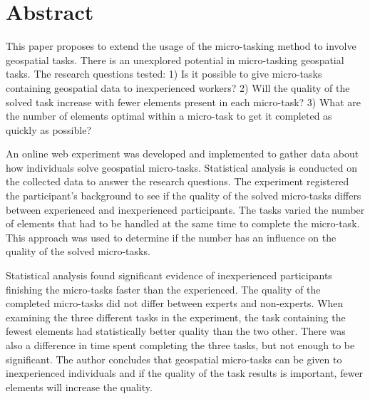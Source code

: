\chapter*{Abstract}
%

This paper proposes to extend the usage of the micro-tasking method to involve geospatial tasks. There is an unexplored potential in micro-tasking geospatial tasks. The research questions tested: 1) Is it possible to give micro-tasks containing geospatial data to inexperienced workers? 2) Will the quality of the solved task increase with fewer elements present in each micro-task? 3) What are the number of elements optimal within a micro-task to get it completed as quickly as possible?

An online web experiment was developed and implemented to gather data about how individuals solve geospatial micro-tasks. Statistical analysis is conducted on the collected data to answer the research questions. The experiment registered the participant's background to see if the quality of the solved micro-tasks differs between experienced and inexperienced participants. The tasks varied the number of elements that had to be handled at the same time to complete the micro-task. This approach was used to determine if the number has an influence on the quality of the solved micro-tasks. 

Statistical analysis found significant evidence of inexperienced participants finishing the micro-tasks faster than the experienced. The quality of the completed micro-tasks did not differ between experts and non-experts. When examining the three different tasks in the experiment, the task containing the fewest elements had statistically better quality than the two other. There was also a difference in time spent completing the three tasks, but not enough to be significant. The author concludes that geospatial micro-tasks can be given to inexperienced individuals and if the quality of the task results is important, fewer elements will increase the quality. 

